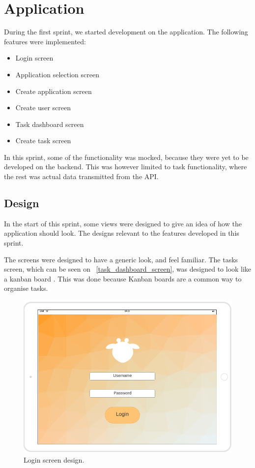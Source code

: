 \section{Application}
During the first sprint, we started development on the application.
The following features were implemented:
\begin{itemize}
    \item Login screen
    \item Application selection screen
    \item Create application screen
    \item Create user screen
    \item Task dashboard screen
    \item Create task screen
\end{itemize}

In this sprint, some of the functionality was mocked, because they were yet to be developed on the backend.
This was however limited to task functionality, where the rest was actual data transmitted from the API.

\subsection{Design}
\label{sprint_1_design}
In the start of this sprint, some views were designed to give an idea of how the application should look.
The designs relevant to the features developed in this sprint.

The screens were designed to have a generic look, and feel familiar.
The tasks screen, which can be seen on ~\autoref{task_dashboard_screen}, was designed to look like a kanban board \cite{kanbanBoard}.
This was done because Kanban boards are a common way to organise tasks.

\begin{figure}[H]
    \includegraphics[width=\textwidth]{Sprint_1/images/login_screen.png}
    \caption{Login screen design.}
    \label{login_screen_design}
\end{figure}

